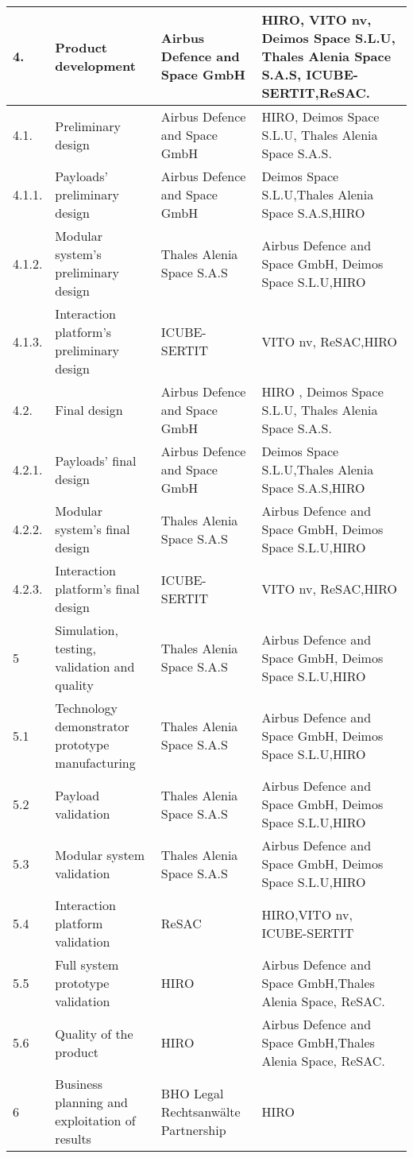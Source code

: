 \begin{longtable}[H]{l p{4cm} p{4cm} p{4cm}}
	\\ \midrule
	4. & Product development &Airbus Defence and Space GmbH& HIRO, VITO nv, Deimos Space S.L.U, Thales Alenia Space S.A.S, ICUBE-SERTIT,ReSAC.
	\\ \midrule
	4.1. & Preliminary design &
	Airbus Defence and Space GmbH& HIRO, Deimos Space S.L.U, Thales Alenia Space S.A.S.
	\\ \midrule
	4.1.1. & Payloads' preliminary design &
	 Airbus Defence and Space GmbH&Deimos Space S.L.U,Thales Alenia Space S.A.S,HIRO
	\\ \midrule
	4.1.2. & Modular system's preliminary design &Thales Alenia Space S.A.S&Airbus Defence and Space GmbH, Deimos Space S.L.U,HIRO
	\\ \midrule
	4.1.3. & Interaction platform's preliminary design &
	ICUBE-SERTIT&VITO nv, ReSAC,HIRO
	\\ \midrule
	4.2. & Final design & 
	Airbus Defence and Space GmbH& HIRO , Deimos Space S.L.U, Thales Alenia Space S.A.S.
	\\ \midrule
	4.2.1. & Payloads' final design &
	Airbus Defence and Space GmbH&Deimos Space S.L.U,Thales Alenia Space S.A.S,HIRO
	\\ \midrule
	4.2.2. & Modular system's final design &
	Thales Alenia Space S.A.S&Airbus Defence and Space GmbH, Deimos Space S.L.U,HIRO
	\\ \midrule
	4.2.3. & Interaction platform's final design & 
	ICUBE-SERTIT&VITO nv, ReSAC,HIRO
	\\ \midrule
	5 & Simulation, testing, validation and quality &Thales Alenia Space S.A.S&Airbus Defence and Space GmbH, Deimos Space S.L.U,HIRO
	\\ \midrule
	5.1 & Technology demonstrator prototype manufacturing &Thales Alenia Space S.A.S&Airbus Defence and Space GmbH, Deimos Space S.L.U,HIRO
	\\ \midrule
	5.2 & Payload validation &Thales Alenia Space S.A.S&Airbus Defence and Space GmbH, Deimos Space S.L.U,HIRO
	\\ \midrule
	5.3 & Modular system validation & Thales Alenia Space S.A.S&Airbus Defence and Space GmbH, Deimos Space S.L.U,HIRO
	\\ \midrule
	5.4 & Interaction platform validation &ReSAC&HIRO,VITO nv, ICUBE-SERTIT
	\\ \midrule 
	5.5 & Full system prototype validation &HIRO&Airbus Defence and Space GmbH,Thales Alenia Space, ReSAC.
	\\ \midrule
		5.6 & Quality of the product &HIRO&Airbus Defence and Space GmbH,Thales Alenia Space, ReSAC.
	\\ \midrule
	6 & Business planning and exploitation of results &BHO Legal Rechtsanwälte Partnership&HIRO
		

\end{longtable}
